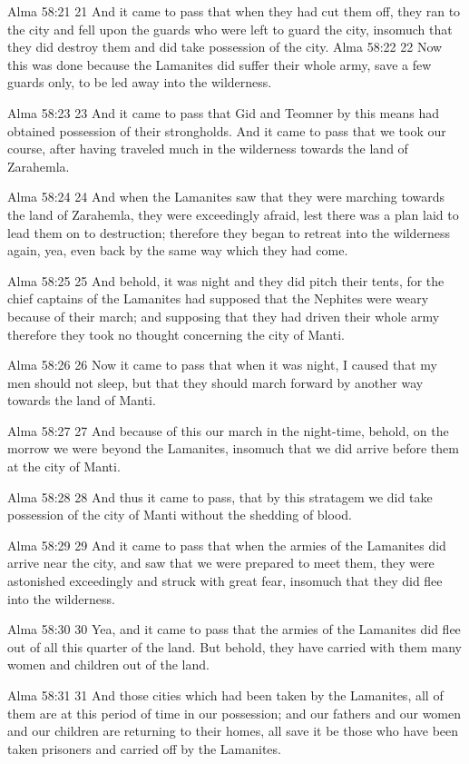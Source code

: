 Alma 58:21
 21 And it came to pass that when they had cut them off, they ran
to the city and fell upon the guards who were left to guard the
city, insomuch that they did destroy them and did take possession
of the city.
Alma 58:22
 22 Now this was done because the Lamanites did suffer their
whole army, save a few guards only, to be led away into the
wilderness.

Alma 58:23
 23 And it came to pass that Gid and Teomner by this means had
obtained possession of their strongholds. And it came to pass
that we took our course, after having traveled much in the
wilderness towards the land of Zarahemla.

Alma 58:24
 24 And when the Lamanites saw that they were marching towards
the land of Zarahemla, they were exceedingly afraid, lest there
was a plan laid to lead them on to destruction; therefore they
began to retreat into the wilderness again, yea, even back by the
same way which they had come.

Alma 58:25
 25 And behold, it was night and they did pitch their tents, for
the chief captains of the Lamanites had supposed that the
Nephites were weary because of their march; and supposing that
they had driven their whole army therefore they took no thought
concerning the city of Manti.

Alma 58:26
 26 Now it came to pass that when it was night, I caused that my
men should not sleep, but that they should march forward by
another way towards the land of Manti.

Alma 58:27
 27 And because of this our march in the night-time, behold, on
the morrow we were beyond the Lamanites, insomuch that we did
arrive before them at the city of Manti.

Alma 58:28
 28 And thus it came to pass, that by this stratagem we did take
possession of the city of Manti without the shedding of blood.

Alma 58:29
 29 And it came to pass that when the armies of the Lamanites did
arrive near the city, and saw that we were prepared to meet them,
they were astonished exceedingly and struck with great fear,
insomuch that they did flee into the wilderness.

Alma 58:30
 30 Yea, and it came to pass that the armies of the Lamanites did
flee out of all this quarter of the land. But behold, they have
carried with them many women and children out of the land.

Alma 58:31
 31 And those cities which had been taken by the Lamanites, all
of them are at this period of time in our possession; and our
fathers and our women and our children are returning to their
homes, all save it be those who have been taken prisoners and
carried off by the Lamanites.

